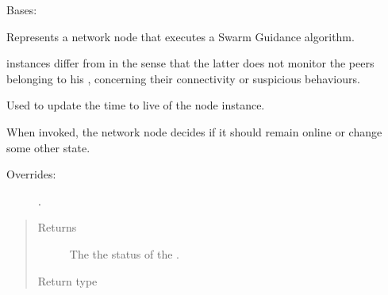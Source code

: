 \documentclass[letterpaper,10pt,english]{sphinxmanual}
\begin{document}
\begin{fulllineitems}
\label{\detokenize{app.domain:app.domain.network_nodes.SGNodeExt}}
Bases: {\hyperref[\detokenize{app.domain:app.domain.network_nodes.SGNode}]{}}

Represents a network node that executes a Swarm Guidance algorithm.

 instances differ from {\hyperref[\detokenize{app.domain:app.domain.network_nodes.SGNode}]{}} in the sense
that the latter does not monitor the peers belonging to his
{\hyperref[\detokenize{app.domain:app.domain.cluster_groups.SGClusterExt}]{}},
concerning their connectivity {\hyperref[\detokenize{app.domain:app.domain.network_nodes.Node.status}]{}} or suspicious
behaviours.

\begin{fulllineitems}
\label{\detokenize{app.domain:app.domain.network_nodes.SGNodeExt.update_status}}
Used to update the time to live of the node instance.

When invoked, the network node decides if it should remain online or
change some other state.
\begin{description}
\item[{Overrides:}] \leavevmode
{\hyperref[\detokenize{app.domain:app.domain.network_nodes.Node.update_status}]{}}.

\end{description}
\begin{quote}\begin{description}
\item[{Returns}] \leavevmode
The the status of the .

\item[{Return type}] \leavevmode
{\hyperref[\detokenize{app.domain.helpers:app.domain.helpers.enums.Status}]{}}

\end{description}\end{quote}

\end{fulllineitems}


\end{fulllineitems}
\end{document}

